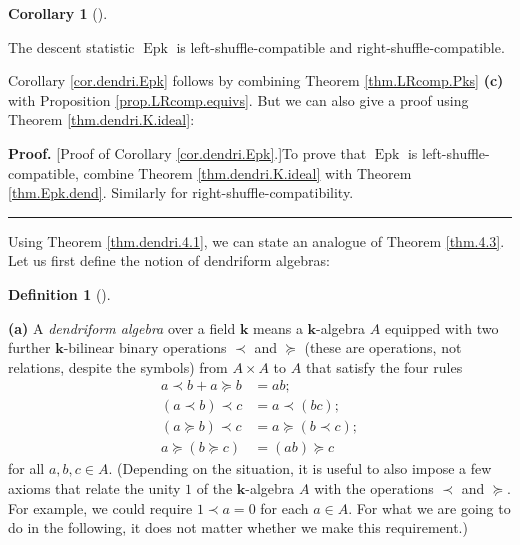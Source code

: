 \documentclass[numbers=enddot,12pt,final,onecolumn,notitlepage]{scrartcl}%
\theoremstyle{definition}
\newtheorem{defi}[theo]{Definition}
\newenvironment{definition}[1][]
{\begin{defi}[#1]\begin{leftbar}}
{\end{leftbar}\end{defi}}
\newtheorem{coro}[theo]{Corollary}
\newenvironment{corollary}[1][]
{\begin{coro}[#1]\begin{leftbar}}
{\end{leftbar}\end{coro}}
\newenvironment{proof}[1][Proof]{\noindent\textbf{#1.} }{\ \rule{0.5em}{0.5em}}
\newenvironment{verlong}{}{}
\begin{document}
\begin{verlong}
\begin{corollary}
\label{cor.dendri.Epk}The descent statistic $\operatorname{Epk}$ is
left-shuffle-compatible and right-shuffle-compatible.
\end{corollary}

Corollary \ref{cor.dendri.Epk} follows by combining Theorem
\ref{thm.LRcomp.Pks} \textbf{(c)} with Proposition \ref{prop.LRcomp.equivs}. But
we can also give a proof using Theorem \ref{thm.dendri.K.ideal}:

\begin{proof}
[Proof of Corollary \ref{cor.dendri.Epk}.]To prove that $\operatorname{Epk}$
is left-shuffle-compatible, combine Theorem \ref{thm.dendri.K.ideal} with
Theorem \ref{thm.Epk.dend}. Similarly for right-shuffle-compatibility.
\end{proof}

Using Theorem \ref{thm.dendri.4.1}, we can state an analogue of Theorem
\ref{thm.4.3}. Let us first define the notion of dendriform algebras:

\begin{definition}
\textbf{(a)} A \textit{dendriform algebra} over a field $\mathbf{k}$ means a
$\mathbf{k}$-algebra $A$ equipped with two further $\mathbf{k}$-bilinear
binary operations $\left.  \prec\right.  $ and $\left.  \succeq\right.  $
(these are operations, not relations, despite the symbols) from $A\times A$ to
$A$ that satisfy the four rules%
\begin{align*}
a\left.  \prec\right.  b+a\left.  \succeq\right.  b  &  =ab;\\
\left(  a\left.  \prec\right.  b\right)  \left.  \prec\right.  c  &  =a\left.
\prec\right.  \left(  bc\right)  ;\\
\left(  a\left.  \succeq\right.  b\right)  \left.  \prec\right.  c  &
=a\left.  \succeq\right.  \left(  b\left.  \prec\right.  c\right)  ;\\
a\left.  \succeq\right.  \left(  b\left.  \succeq\right.  c\right)   &
=\left(  ab\right)  \left.  \succeq\right.  c
\end{align*}
for all $a,b,c\in A$. (Depending on the situation, it is useful to also impose
a few axioms that relate the unity $1$ of the $\mathbf{k}$-algebra $A$ with
the operations $\left.  \prec\right.  $ and $\left.  \succeq\right.  $. For
example, we could require $1\left.  \prec\right.  a=0$ for each $a\in A$. For
what we are going to do in the following, it does not matter whether we make
this requirement.)


\end{definition}
\end{verlong}
\end{document}
